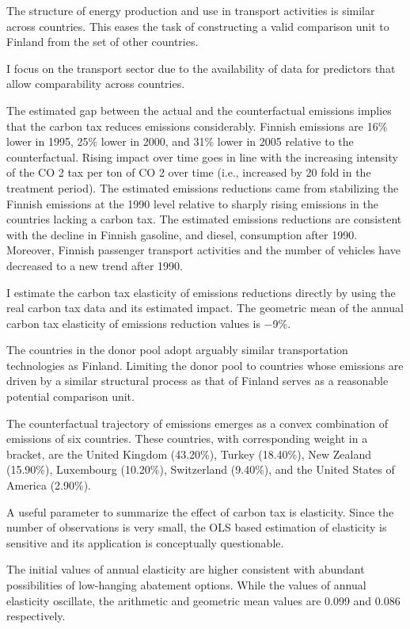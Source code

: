 \documentclass[
]{book}
\begin{document}
The structure of energy production and use in transport activities is
similar across countries. This eases the task of constructing a valid comparison unit to
Finland from the set of other countries.

I focus on the transport sector due to the availability of data for
predictors that allow comparability across countries.

The estimated gap between the actual and the counterfactual emissions implies that
the carbon tax reduces emissions considerably. Finnish emissions are 16\% lower in 1995,
25\% lower in 2000, and 31\% lower in 2005 relative to the counterfactual. Rising impact
over time goes in line with the increasing intensity of the CO 2 tax per ton of CO 2 over
time (i.e., increased by 20 fold in the treatment period). The estimated emissions
reductions came from stabilizing the Finnish emissions at the 1990 level relative to
sharply rising emissions in the countries lacking a carbon tax. The estimated emissions
reductions are consistent with the decline in Finnish gasoline, and diesel, consumption
after 1990. Moreover, Finnish passenger transport activities and the number of vehicles
have decreased to a new trend after 1990.

I estimate the carbon tax elasticity of
emissions reductions directly by using the real carbon tax data and its estimated impact.
The geometric mean of the annual carbon tax elasticity of emissions reduction values is
−9\%.

The countries in the donor pool adopt arguably similar transportation technologies as
Finland. Limiting the donor pool to countries whose emissions are driven by a similar
structural process as that of Finland serves as a reasonable potential comparison unit.

The
counterfactual trajectory of emissions emerges as a convex combination of emissions of
six countries. These countries, with corresponding weight in a bracket, are the United
Kingdom (43.20\%), Turkey (18.40\%), New Zealand (15.90\%), Luxembourg (10.20\%),
Switzerland (9.40\%), and the United States of America (2.90\%).

A useful parameter to summarize the effect of carbon tax is elasticity. Since the
number of observations is very small, the OLS based estimation of elasticity is sensitive
and its application is conceptually questionable.

The initial values of annual
elasticity are higher consistent with abundant possibilities of low-hanging abatement
options. While the values of annual elasticity oscillate, the arithmetic and geometric
mean values are 0.099 and 0.086 respectively.
\end{document}
